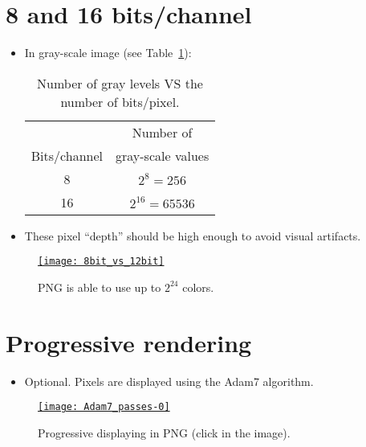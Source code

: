\section{8 and 16 bits/channel}
\begin{itemize}
\item In gray-scale image (see Table~\ref{tab:gray_levels}):
  \begin{table}[!h]
    \vspace{2ex}
    \begin{center}
      \begin{tabular}{c|c}
        & Number of \\
        Bits/channel & gray-scale values \\
        \hline
        8 & $2^8=256$ \\
        16 & $2^{16}=65536$
      \end{tabular}
    \vspace{2ex}
    \end{center}
    \caption{Number of gray levels VS the number of bits/pixel.}
    \label{tab:gray_levels}
  \end{table}
  \newpage
\item These pixel ``depth'' should be high enough to avoid visual artifacts.
\end{itemize}
\begin{figure}[H]
  \vspace{-2ex}
  \centering
    \href{https://www.fastcompression.com/blog/jpeg2000-applications-part1.htm}{\texttt{[image: 8bit\_vs\_12bit]}}
  \caption{\gls{PNG} is able to use up to $2^{24}$ colors.}
  \label{fig:PNG_colors}
\end{figure}

\section{Progressive rendering}
\begin{itemize}
\item Optional. Pixels are displayed using the Adam7 algorithm.
\end{itemize}
\begin{figure}[H]
  \vspace{-2ex}
  \centering
  \href{https://upload.wikimedia.org/wikipedia/commons/2/27/Adam7_passes.gif}{\texttt{[image: Adam7\_passes-0]}}
  \caption{Progressive displaying in \gls{PNG} (click in the image).}
  \label{fig:PNG_progressive}
\end{figure}
  
